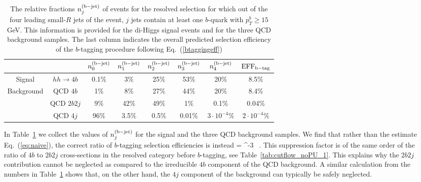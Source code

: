 \begin{table}[t]
  \centering
  \small
  \begin{tabular}{|c|c|c|c|c|c|c|c|}
    \hline
  \multicolumn{2}{|c|}{}   &  $n^{\rm (b-jet)}_0$  &  $n^{\rm (b-jet)}_1$  &  $n^{\rm (b-jet)}_2$  & $n^{\rm (b-jet)}_3$ &
    $n^{\rm (b-jet)}_4$ & ${\rm EFF}_{\rm b-tag}$ \\
    \hline
    \hline
    Signal  &  $hh\to 4b$  &   0.1\%    & 3\%     &  25\%     & 53\%     & 20\%      & 8.5\%  \\
    \hline
    \multirow{3}{*}{Background}  &  QCD $4b$  & 1\%      &  8\%    &   27\%   &  44\%     & 20\%       &  8.4\% \\
     &  QCD $2b2j$  &   9\%    & 42\%     &  49\%    & 1\%     &  0.1\%     & 0.04\%  \\
    &  QCD $4j$  &   96\%    &  3.5\%     & 0.5\%     &  0.01\%    & $3\cdot 10^{-4}$\%      &
    $2\cdot 10^{-4}$\%\\
    \hline
  \end{tabular}
  \caption{\small
    The relative fractions  $n^{\rm (b-jet)}_j$ of events for the resolved selection
    for which out of the four leading small-$R$ jets of the
    event, $j$ jets
    contain at least one $b$-quark with $p_T^b\ge 15$ GeV.
    This information is provided
    for the di-Higgs signal events and for the three QCD background samples.
    The last column indicates the overall predicted
    selection efficiency of the $b$-tagging procedure following
    Eq.~(\ref{btaggingeff})
    \label{tab:btaggingcheck}
  }
  \end{table}

In Table~\ref{tab:btaggingcheck} we collect
the values of $n^{\rm (b-jet)}_j$ for the signal and the three QCD background samples.
%
We find that rather than the estimate Eq.~(\ref{eq:naive}),
the correct ratio of $b$-tagging selection efficiencies is instead
\be
{}=
   ^{-3} \, .
  \ee
  This suppression factor is of the same order of the ratio of $4b$ to $2b2j$ cross-sections
  in the resolved category before $b$-tagging, see Table~\ref{tab:cutflow_noPU_1}.
    This explains why the $2b2j$ contribution cannot be neglected as compared
    to the irreducible $4b$ component of the QCD background.
    A similar calculation from the numbers in Table~\ref{tab:btaggingcheck} shows
    that, on the other hand, the $4j$ component of the background can typically
    be safely neglected.
    

